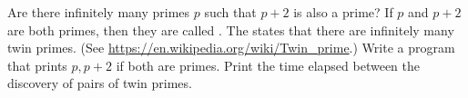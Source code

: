   Are there infinitely many primes $p$ such that $p + 2$ is also a prime?
  If $p$ and $p + 2$ are both primes, then they are called .
  The  states that there are infinitely many
  twin primes.
  (See \url{https://en.wikipedia.org/wiki/Twin_prime}.)
  Write a program that prints $p,p+2$ if both are primes.
  Print the time elapsed between the discovery of pairs of twin primes. 

